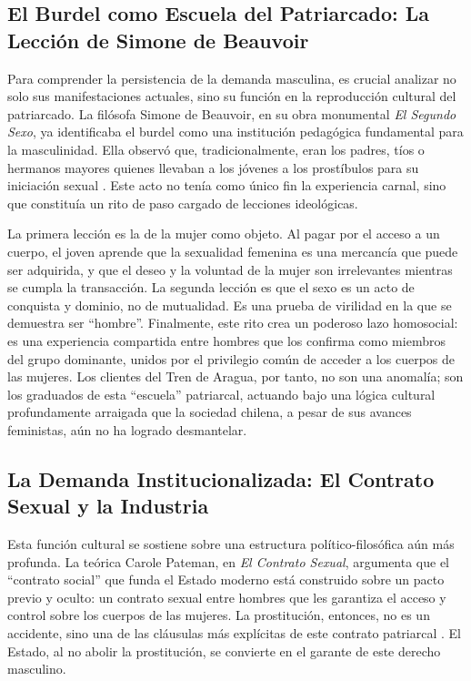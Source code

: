 \documentclass[12pt, a4paper]{article}
\begin{document}
\subsection*{El Burdel como Escuela del Patriarcado: La Lección de Simone de Beauvoir}

Para comprender la persistencia de la demanda masculina, es crucial analizar no solo sus manifestaciones actuales, sino su función en la reproducción cultural del patriarcado. La filósofa Simone de Beauvoir, en su obra monumental \textit{El Segundo Sexo}, ya identificaba el burdel como una institución pedagógica fundamental para la masculinidad. Ella observó que, tradicionalmente, eran los padres, tíos o hermanos mayores quienes llevaban a los jóvenes a los prostíbulos para su iniciación sexual \cite{beauvoir}. Este acto no tenía como único fin la experiencia carnal, sino que constituía un rito de paso cargado de lecciones ideológicas.

La primera lección es la de la mujer como objeto. Al pagar por el acceso a un cuerpo, el joven aprende que la sexualidad femenina es una mercancía que puede ser adquirida, y que el deseo y la voluntad de la mujer son irrelevantes mientras se cumpla la transacción. La segunda lección es que el sexo es un acto de conquista y dominio, no de mutualidad. Es una prueba de virilidad en la que se demuestra ser ``hombre''. Finalmente, este rito crea un poderoso lazo homosocial: es una experiencia compartida entre hombres que los confirma como miembros del grupo dominante, unidos por el privilegio común de acceder a los cuerpos de las mujeres. Los clientes del Tren de Aragua, por tanto, no son una anomalía; son los graduados de esta ``escuela'' patriarcal, actuando bajo una lógica cultural profundamente arraigada que la sociedad chilena, a pesar de sus avances feministas, aún no ha logrado desmantelar.

\newpage

\subsection*{La Demanda Institucionalizada: El Contrato Sexual y la Industria}

Esta función cultural se sostiene sobre una estructura político-filosófica aún más profunda. La teórica Carole Pateman, en \textit{El Contrato Sexual}, argumenta que el ``contrato social'' que funda el Estado moderno está construido sobre un pacto previo y oculto: un contrato sexual entre hombres que les garantiza el acceso y control sobre los cuerpos de las mujeres. La prostitución, entonces, no es un accidente, sino una de las cláusulas más explícitas de este contrato patriarcal \cite{pateman}. El Estado, al no abolir la prostitución, se convierte en el garante de este derecho masculino.
\end{document}
